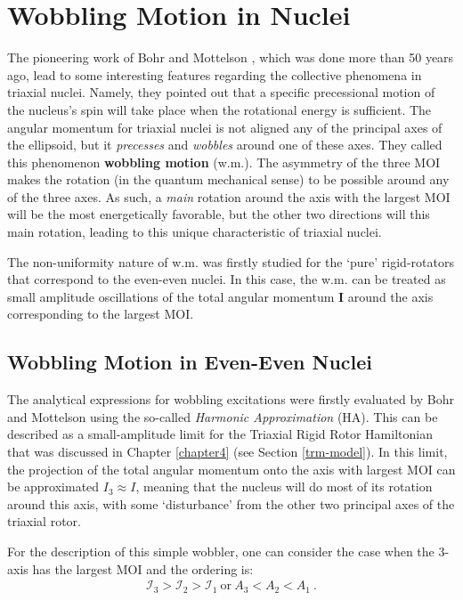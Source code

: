 \chapter{Wobbling Motion in Nuclei}
\label{chapter-5}

The pioneering work of Bohr and Mottelson \cite{bohr1998nuclear}, which was done more than 50 years ago, lead to some interesting features regarding the collective phenomena in triaxial nuclei. Namely, they pointed out that a specific precessional motion of the nucleus's spin will take place when the rotational energy is sufficient. The angular momentum for triaxial nuclei is not aligned any of the principal axes of the ellipsoid, but it \emph{precesses} and \emph{wobbles} around one of these axes. They called this phenomenon \textbf{wobbling motion} (w.m.). The asymmetry of the three MOI makes the rotation (in the quantum mechanical sense) to be possible around any of the three axes. As such, a \emph{main} rotation around the axis with the largest MOI will be the most energetically favorable, but the other two directions will this main rotation, leading to this unique characteristic of triaxial nuclei.

The non-uniformity nature of w.m. was firstly studied for the `pure' rigid-rotators that correspond to the even-even nuclei. In this case, the w.m. can be treated as small amplitude oscillations of the total angular momentum $\mathbf{I}$ around the axis corresponding to the largest MOI.

\section{Wobbling Motion in Even-Even Nuclei}

The analytical expressions for wobbling excitations were firstly evaluated by Bohr and Mottelson using the so-called \emph{Harmonic Approximation} (HA). This can be described as a small-amplitude limit for the Triaxial Rigid Rotor Hamiltonian that was discussed in Chapter \ref{chapter4} (see Section \ref{trm-model}). In this limit, the projection of the total angular momentum onto the axis with largest MOI can be approximated $I_3\approx I$, meaning that the nucleus will do most of its rotation around this axis, with some `disturbance' from the other two principal axes of the triaxial rotor. 

For the description of this simple wobbler, one can consider the case when the $3$-axis has the largest MOI and the ordering is:
\begin{align}
    \mathcal{I}_3>\mathcal{I}_2>\mathcal{I}_1\ \text{or}\ A_3<A_2<A_1\ .
\end{align}

